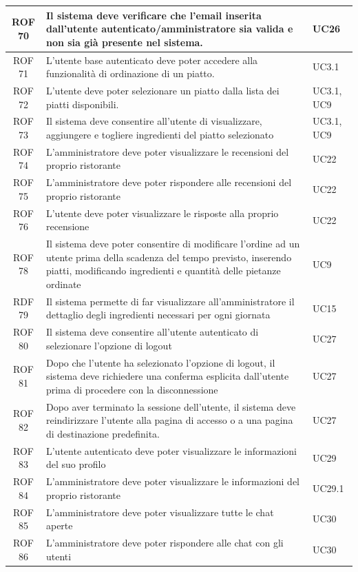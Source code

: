 \documentclass[12pt, oneside]{article}
\begin{document}
\begin{longtable}{|c|p{14cm}|p{2cm}|}
    \hline
    ROF 70 & Il sistema deve verificare che l'email inserita dall'utente autenticato/amministratore sia valida e non sia già presente nel sistema.  & UC26  \\
    \hline
    ROF 71 & L'utente base autenticato deve poter accedere alla funzionalità di ordinazione di un piatto.  & UC3.1  \\
    \hline
    ROF 72 & L'utente deve poter selezionare un piatto dalla lista dei piatti disponibili.  & UC3.1, UC9  \\
    \hline
    ROF 73 & Il sistema deve consentire all'utente di visualizzare, aggiungere e togliere ingredienti del piatto selezionato  & UC3.1, UC9  \\
    \hline
    ROF 74 & L'amministratore deve poter visualizzare le recensioni del proprio ristorante & UC22 \\ 
    \hline
    ROF 75 & L'amministratore deve poter rispondere alle recensioni del proprio ristorante & UC22 \\
    \hline
    ROF 76 & L'utente deve poter visualizzare le risposte alla proprio recensione & UC22 \\
    \hline
    ROF 78 & Il sistema deve poter consentire di modificare l'ordine ad un utente prima della scadenza del tempo previsto, inserendo piatti, modificando ingredienti e quantità delle pietanze ordinate & UC9 \\
    \hline
    RDF 79 & Il sistema permette di far visualizzare all'amministratore il dettaglio degli ingredienti necessari per ogni giornata & UC15 \\
    \hline
    ROF 80 & Il sistema deve consentire all'utente autenticato di selezionare l'opzione di logout & UC27 \\
    \hline
    ROF 81 & Dopo che l'utente ha selezionato l'opzione di logout, il sistema deve richiedere una conferma esplicita dall'utente prima di procedere con la disconnessione & UC27 \\ 
    \hline
    ROF 82 & Dopo aver terminato la sessione dell'utente, il sistema deve reindirizzare l'utente alla pagina di accesso o a una pagina di destinazione predefinita. & UC27 \\
    \hline
    ROF 83 & L'utente autenticato deve poter visualizzare le informazioni del suo profilo & UC29 \\ 
    \hline
    ROF 84 & L'amministratore deve poter visualizzare le informazioni del proprio ristorante & UC29.1 \\
    \hline
    ROF 85 & L'amministratore deve poter visualizzare tutte le chat aperte & UC30 \\
    \hline
    ROF 86 & L'amministratore deve poter rispondere alle chat con gli utenti & UC30 \\
    \hline
\end{longtable}
\newpage
\end{document}
